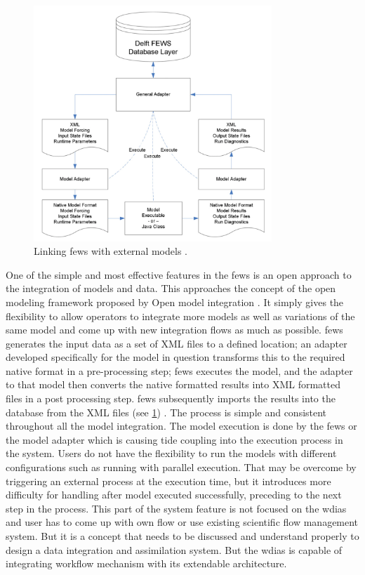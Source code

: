 \begin{figure}[htp]
    \centering
    \includegraphics[width=0.8\textwidth]{lit/fews/Linking-Delft-FEWS-with-external-models-The-fi-gure-shows-the-fl-ow-of-data-through-XML_W640.png}
    \caption[Linking \acrshort{fews} with external models]{Linking \acrshort{fews} with external models \cite{Werner2013TheSystem}.}
    \label{fi:fews_general_adapter}
\end{figure}
One of the simple and most effective features in the \acrshort{fews} is an open approach to the integration of models and data. This approaches the concept of the open modeling framework proposed by Open model integration \cite{Kokkonen2003InterfacingXML}. It simply gives the flexibility to allow operators to integrate more models as well as variations of the same model and come up with new integration flows as much as possible.
\acrshort{fews} generates the input data as a set of XML files to a defined location; an adapter developed specifically for the model in question transforms this to the required native format in a pre-processing step; \acrshort{fews} executes the model, and the adapter to that model then converts the native formatted results into XML formatted files in a post processing step. \acrshort{fews} subsequently imports the results into the database from the XML files (see \cref{fi:fews_general_adapter}) \cite{Werner2013TheSystem}. The process is simple and consistent throughout all the model integration. The model execution is done by the \acrshort{fews} or the model adapter which is causing tide coupling into the execution process in the system. Users do not have the flexibility to run the models with different configurations such as running with parallel execution. That may be overcome by triggering an external process at the execution time, but it introduces more difficulty for handling after model executed successfully, preceding to the next step in the process. This part of the system feature is not focused on the \acrshort{wdias} and user has to come up with own flow or use existing scientific flow management system. But it is a concept that needs to be discussed and understand properly to design a data integration and assimilation system. But the \acrshort{wdias} is capable of integrating workflow mechanism with its extendable architecture.

